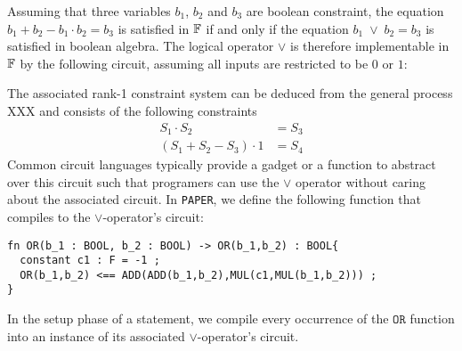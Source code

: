 Assuming that three variables $b_1$, $b_2$ and $b_3$ are boolean constraint, the equation $b_1 + b_2 - b_1\cdot b_2 = b_3$ is satisfied in $\mathbb{F}$ if and only if the equation $b_1 \; \vee \; b_2 = b_3$ is satisfied in boolean algebra. The logical operator $\vee$ is therefore implementable in $\mathbb{F}$ by the following circuit, assuming all inputs are restricted to be $0$ or $1$:
\begin{center}
\end{center}
The associated rank-1 constraint system can be deduced from the general process XXX and consists of the following constraints
\begin{align*}
S_1 \cdot S_2 & = S_3\\
(S_1 + S_2 - S_3)\cdot 1 &= S_4
\end{align*}
Common circuit languages typically provide a gadget or a function to abstract over this circuit such that programers can use the $\vee$ operator without caring about the associated circuit. In \texttt{PAPER}, we define the following function that compiles to the $\vee$-operator's circuit:
\begin{lstlisting}
fn OR(b_1 : BOOL, b_2 : BOOL) -> OR(b_1,b_2) : BOOL{
  constant c1 : F = -1 ;
  OR(b_1,b_2) <== ADD(ADD(b_1,b_2),MUL(c1,MUL(b_1,b_2))) ;
}
\end{lstlisting}
In the setup phase of a statement, we compile every occurrence of the $\mathtt{OR}$ function into an instance of its associated $\vee$-operator's circuit.
